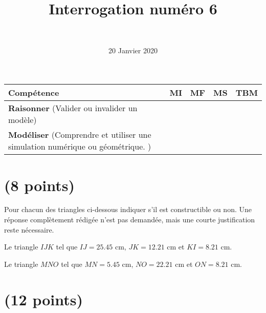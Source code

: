 \documentclass[a4paper,11pt]{exam}
\author{\ }
\date{20 Janvier 2020}
\title{Interrogation num\'ero 6}
\begin{document}
%	

\maketitle


\begin{small}
	\begin{center}
		\begin{tabular}{|@{\ }l@{\ }|@{\ }c@{\ }|@{\ }c@{\ }|@{\ }c@{\ }|@{\ }c@{\ }|}
			\hline
			\textbf{Compétence} & \textbf{MI} & \textbf{MF} & \textbf{MS} & \textbf{TBM} \\
			
			\hline	
			 \textbf{Raisonner} (Valider ou invalider un modèle) &  \ \ & \ \ & \ \ & \ \  \\
			\hline
			\textbf{Modéliser} (Comprendre et utiliser une simulation numérique ou géométrique. )&  \ \ & \ \ & \ \ & \ \  \\			
			\hline
		\end{tabular}
	\end{center}
\end{small}


\vspace*{-0.7cm}
\section{(8 points)}
\vspace*{-0.3cm}

Pour chacun des triangles ci-dessous indiquer s'il est constructible ou non. Une réponse complètement rédigée n'est pas demandée, mais une courte justification reste nécessaire.

\begin{questions}
	\question[4]
	Le triangle $IJK$ tel que $IJ = \num{25.45}$ cm, $JK = \num{12.21}$ cm et $KI = \num{8.21}$ cm.
	
	\fillwithdottedlines{1cm}
	
	\question[4]
	
	Le triangle $MNO$ tel que $MN = \num{5.45}$ cm, $NO = \num{22.21}$ cm et $ON = \num{8.21}$ cm.
	
	\fillwithdottedlines{1cm}
\end{questions}



\vspace*{-0.5cm}

\section{(12 points)}
\end{document}
